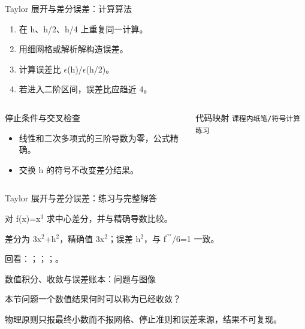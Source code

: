 \begin{frame}[t]{Taylor 展开与差分误差：计算算法}
\footnotesize
{}\begin{enumerate}
\item 在 h、h/\allowbreak{}2、h/\allowbreak{}4 上重复同一计算。
\item 用细网格或解析解构造误差。
\item 计算误差比 \ensuremath{\epsilon}(h)/\allowbreak{}\ensuremath{\epsilon}(h/\allowbreak{}2)。
\item 若进入二阶区间，误差比应趋近 4。
\end{enumerate}\begin{columns}[T,onlytextwidth]
\begin{block}{停止条件与交叉检查}\scriptsize\begin{itemize}
\item[\CheckMark] 线性和二次多项式的三阶导数为零，公式精确。
\item[\CheckMark] 交换 h 的符号不改变差分结果。
\end{itemize}\end{block}
\begin{block}{代码映射}
\scriptsize \texttt{课程内纸笔/\allowbreak{}符号计算练习}
\end{block}\end{columns}\end{frame}

\begin{frame}[t]{Taylor 展开与差分误差：练习与完整解答}
\footnotesize
\begin{block}{}对 f(x)=x\ensuremath{^{3}} 求中心差分，并与精确导数比较。\end{block}
\begin{exampleblock}{}差分为 3x\ensuremath{^{2}}+h\ensuremath{^{2}}，精确值 3x\ensuremath{^{2}}；误差 h\ensuremath{^{2}}，与 f\ensuremath{^{\prime\prime\prime}}/\allowbreak{}6=1 一致。\end{exampleblock}
\vfill
\scriptsize 回看：；；；。
\end{frame}

\begin{frame}[t]{数值积分、收敛与误差账本：问题与图像}
\footnotesize
\begin{block}{本节问题}一个数值结果何时可以称为已经收敛？\end{block}
\begin{block}{物理原则}\quad 只报最终小数而不报网格、停止准则和误差来源，结果不可复现。\end{block}
\end{frame}

